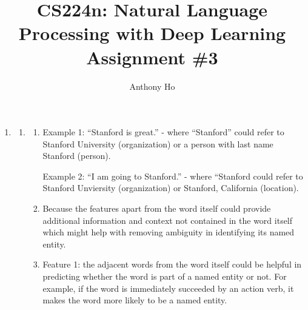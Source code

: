 \documentclass[10pt,reqno]{amsart}
\begin{document}
\title{CS224n: Natural Language Processing with Deep Learning\\Assignment \#3}
\author{Anthony Ho}
\maketitle


\newcommand{\f}{\frac}
\newcommand{\pd}[1]{\frac{\partial}{\partial #1}}
\newcommand{\pdd}[2]{\frac{\partial #1}{\partial #2}}
\newcommand{\softmax}{\text{softmax}}


\renewcommand{\labelenumi}{\arabic{enumi}.}
\begin{enumerate}[topsep=0pt,itemsep=3ex,partopsep=1ex,parsep=1ex]


\item
  \begin{enumerate}[itemsep=2ex]
  \item 
    \begin{enumerate}[itemsep=2ex]
      \item
        Example 1: ``Stanford is great.'' - where ``Stanford'' could refer to 
        Stanford University (organization) or a person with last name Stanford (person).

        Example 2: ``I am going to Stanford.'' - where ``Stanford could refer to 
        Stanford Unviersity (organization) or Stanford, California (location).
      \item Because the features apart from the word itself could provide additional information 
        and context not contained in the word itself which might help with 
        removing ambiguity in identifying its named entity.
      \item
        Feature 1: the adjacent words from the word itself could be helpful in predicting
        whether the word is part of a named entity or not. For example, if the word is 
        immediately succeeded by an action verb, it makes the word more likely to be a 
        named entity. 


\end{enumerate}
\end{enumerate}
\end{enumerate}
\end{document}
